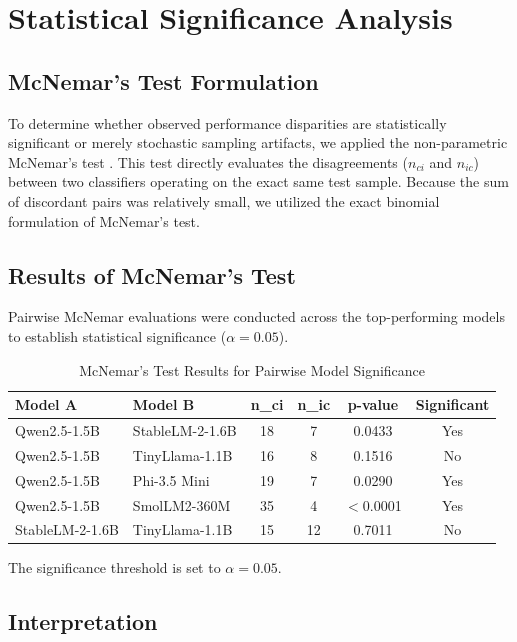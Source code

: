 \documentclass[journal]{IEEEtran}
\begin{document}
\section{Statistical Significance Analysis}

\subsection{McNemar's Test Formulation}

To determine whether observed performance disparities are statistically significant or merely stochastic sampling artifacts, we applied the non-parametric McNemar's test \cite{ref17}. This test directly evaluates the disagreements ($n_{ci}$ and $n_{ic}$) between two classifiers operating on the exact same test sample. Because the sum of discordant pairs was relatively small, we utilized the exact binomial formulation of McNemar's test.

\subsection{Results of McNemar's Test}

Pairwise McNemar evaluations were conducted across the top-performing models to establish statistical significance ($\alpha = 0.05$).

\begin{table}[htbp]
\caption{McNemar's Test Results for Pairwise Model Significance}
\label{tab:mcnemar_results}
\centering
\begin{tabular}{llcccc}
\toprule
\textbf{Model A} & \textbf{Model B} & \textbf{n\_ci} & \textbf{n\_ic} & \textbf{p-value} & \textbf{Significant} \\
\midrule
Qwen2.5-1.5B & StableLM-2-1.6B & 18 & 7 & 0.0433 & Yes \\
Qwen2.5-1.5B & TinyLlama-1.1B & 16 & 8 & 0.1516 & No \\
Qwen2.5-1.5B & Phi-3.5 Mini & 19 & 7 & 0.0290 & Yes \\
Qwen2.5-1.5B & SmolLM2-360M & 35 & 4 & $<$0.0001 & Yes \\
StableLM-2-1.6B & TinyLlama-1.1B & 15 & 12 & 0.7011 & No \\
\bottomrule
\end{tabular}
\end{table}

The significance threshold is set to $\alpha = 0.05$.

\subsection{Interpretation}
\end{document}
